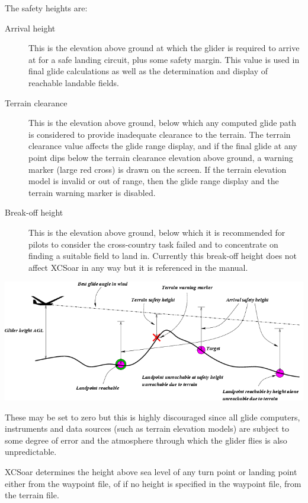 \documentclass[a4paper,12pt]{refrep}
\begin{document}
The safety heights are:
\begin{description}
\item[Arrival height]  This is the elevation above ground at which
 the glider is required to arrive at for a safe landing circuit, plus
 some safety margin.  This value is used in final glide calculations as
 well as the determination and display of reachable landable fields.
\item[Terrain clearance]
 This is the elevation above ground, below which any computed glide
 path is considered to provide inadequate clearance to the terrain.
 The terrain clearance value affects the glide range display, and if
 the final glide at any point dips below the terrain clearance
 elevation above ground, a warning marker (large red cross) is drawn
 on the screen.  If the terrain elevation model is invalid or out of
 range, then the glide range display and the terrain warning marker is
 disabled.
\item[Break-off height]  This is the elevation above ground, below which 
 it is recommended for pilots to consider the cross-country task
 failed and to concentrate on finding a suitable field to land in.
 Currently this break-off height does not affect XCSoar in any way but
 it is referenced in the manual.
\end{description}

\begin{maxipage}
\begin{center}
\includegraphics[angle=0,width=\linewidth,keepaspectratio='true']{figures/fig-terrain.png}
\end{center}
\end{maxipage}

\warning
These may be set to zero but this is highly discouraged since all
glide computers, instruments and data sources (such as terrain
elevation models) are subject to some degree of error and the
atmosphere through which the glider flies is also unpredictable.

XCSoar determines the height above sea level of any turn point or
landing point either from the waypoint file, of if no height is
specified in the waypoint file, from the terrain file.
\end{document}
